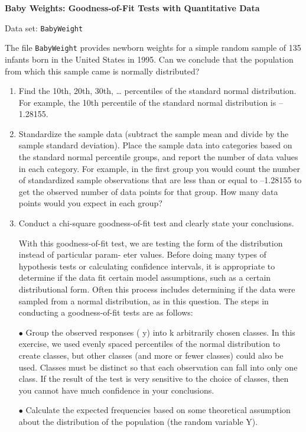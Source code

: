 \documentclass[
]{report}
\begin{document}
\begin{list}{E.}{ \setlength{\itemsep}{0.5em}}
  \item \textbf{Baby Weights: Goodness-of-Fit Tests with Quantitative Data}    

  Data set: \texttt{BabyWeight}    
  
  The file \texttt{BabyWeight} provides newborn weights for a simple random sample of 135 infants born in the United States in 1995. Can we conclude that the population from which this sample came is normally distributed?  
  \begin{enumerate}
    \item Find the 10th, 20th, 30th, … percentiles of the standard normal distribution. For example, the 10th percentile of the standard normal distribution is –1.28155.
    \item Standardize the sample data (subtract the sample mean and divide by the sample standard deviation). Place the sample data into categories based on the standard normal percentile groups, and report the number of data values in each category. For example, in the first group you would count the number of standardized sample observations that are less than or equal to –1.28155 to get the observed number of data points for that group. How many data points would you expect in each group?
    \item Conduct a chi-square goodness-of-fit test and clearly state your conclusions.
    
    With this goodness-of-fit test, we are testing the form of the distribution instead of particular param-
eter values. Before doing many types of hypothesis tests or calculating confidence intervals, it is
appropriate to determine if the data fit certain model assumptions, such as a certain distributional
form. Often this process includes determining if the data were sampled from a normal distribution, as
in this question. The steps in conducting a goodness-of-fit tests are as follows:
  
  $\bullet$ Group the observed responses ( y) into k arbitrarily chosen classes. In this exercise, we used evenly
  spaced percentiles of the normal distribution to create classes, but other classes (and more or fewer
  classes) could also be used. Classes must be distinct so that each observation can fall into only one
  class. If the result of the test is very sensitive to the choice of classes, then you cannot have much
  confidence in your conclusions.
  
  $\bullet$ Calculate the expected frequencies based on some theoretical assumption about the distribution of
  the population (the random variable Y).
  

\end{enumerate}
\end{list}
\end{document}
